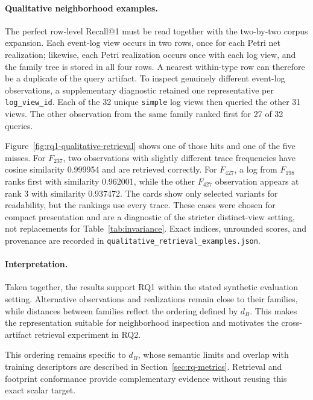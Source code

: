 \documentclass[mathematics,article,submit,moreauthors]{Definitions/mdpi}
\begin{document}
\paragraph{Qualitative neighborhood examples.}
The perfect row-level Recall@1 must be read together with the two-by-two corpus expansion. Each event-log view occurs in two rows, once for each Petri net realization; likewise, each Petri realization occurs once with each log view, and the family tree is stored in all four rows. A nearest within-type row can therefore be a duplicate of the query artifact. To inspect genuinely different event-log observations, a supplementary diagnostic retained one representative per \texttt{log\_view\_id}. Each of the 32 unique \texttt{simple} log views then queried the other 31 views. The other observation from the same family ranked first for 27 of 32 queries.

Figure~\ref{fig:rq1-qualitative-retrieval} shows one of those hits and one of the five misses. For \(F_{237}\), two observations with slightly different trace frequencies have cosine similarity 0.999954 and are retrieved correctly. For \(F_{427}\), a log from \(F_{198}\) ranks first with similarity 0.962001, while the other \(F_{427}\) observation appears at rank 3 with similarity 0.937472. The cards show only selected variants for readability, but the rankings use every trace. These cases were chosen for compact presentation and are a diagnostic of the stricter distinct-view setting, not replacements for Table~\ref{tab:invariance}. Exact indices, unrounded scores, and provenance are recorded in \texttt{qualitative\_retrieval\_examples.json}.



\paragraph{Interpretation.}
Taken together, the results support RQ1 within the stated synthetic evaluation setting. Alternative observations and realizations remain close to their families, while distances between families reflect the ordering defined by $d_B$. This makes the representation suitable for neighborhood inspection and motivates the cross-artifact retrieval experiment in RQ2.

This ordering remains specific to $d_B$, whose semantic limits and overlap with training descriptors are described in Section~\ref{sec:rq-metrics}. Retrieval and footprint conformance provide complementary evidence without reusing this exact scalar target.
\end{document}
